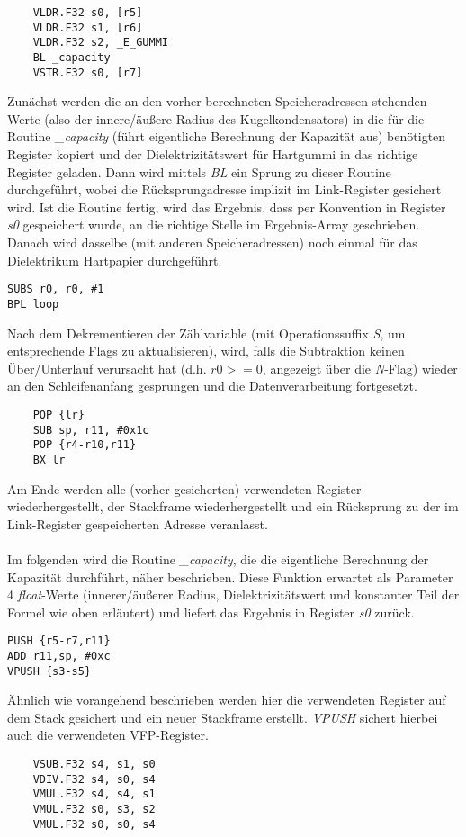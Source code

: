 \documentclass[11pt]{scrartcl}
\begin{document}
\begin{verbatim}
	VLDR.F32 s0, [r5]
	VLDR.F32 s1, [r6]
	VLDR.F32 s2, _E_GUMMI
	BL _capacity
	VSTR.F32 s0, [r7]
\end{verbatim}
Zunächst werden die an den vorher berechneten Speicheradressen stehenden Werte (also der innere/äußere Radius des Kugelkondensators) in die für die Routine \emph{\_capacity} (führt eigentliche Berechnung der Kapazität aus) benötigten Register kopiert und der Dielektrizitätswert für Hartgummi in das richtige Register geladen. Dann wird mittels \emph{BL} ein Sprung zu dieser Routine durchgeführt, wobei die Rücksprungadresse implizit im Link-Register gesichert wird. Ist die Routine fertig, wird das Ergebnis, dass per Konvention in Register \emph{s0} gespeichert wurde, an die richtige Stelle im Ergebnis-Array geschrieben.
Danach wird dasselbe (mit anderen Speicheradressen) noch einmal für das Dielektrikum Hartpapier durchgeführt.
\begin{verbatim}
SUBS r0, r0, #1
BPL loop
\end{verbatim} 
Nach dem Dekrementieren der Zählvariable (mit Operationssuffix \emph{S}, um entsprechende Flags zu aktualisieren), wird, falls die Subtraktion keinen Über/Unterlauf verursacht hat (d.h. $r0 >= 0$, angezeigt über die \emph{N}-Flag) wieder an den Schleifenanfang gesprungen und die Datenverarbeitung fortgesetzt.
\begin{verbatim}
	POP {lr}
	SUB sp, r11, #0x1c
	POP {r4-r10,r11}
	BX lr
\end{verbatim}
Am Ende werden alle (vorher gesicherten) verwendeten Register wiederhergestellt, der Stackframe wiederhergestellt und ein Rücksprung zu der im Link-Register gespeicherten Adresse veranlasst.
\\\\
Im folgenden wird die Routine \emph{\_capacity}, die die eigentliche Berechnung der Kapazität durchführt, näher beschrieben. Diese Funktion erwartet als Parameter 4 \emph{float}-Werte (innerer/äußerer Radius, Dielektrizitätswert und konstanter Teil der Formel wie oben erläutert) und liefert das Ergebnis in Register \emph{s0} zurück.
\begin{verbatim}
PUSH {r5-r7,r11}
ADD r11,sp, #0xc
VPUSH {s3-s5}
\end{verbatim}
Ähnlich wie vorangehend beschrieben werden hier die verwendeten Register auf dem Stack gesichert und ein neuer Stackframe erstellt. \emph{VPUSH} sichert hierbei auch die verwendeten VFP-Register.
\begin{verbatim}
	VSUB.F32 s4, s1, s0
	VDIV.F32 s4, s0, s4
	VMUL.F32 s4, s4, s1
	VMUL.F32 s0, s3, s2
	VMUL.F32 s0, s0, s4
\end{verbatim}
\end{document}
